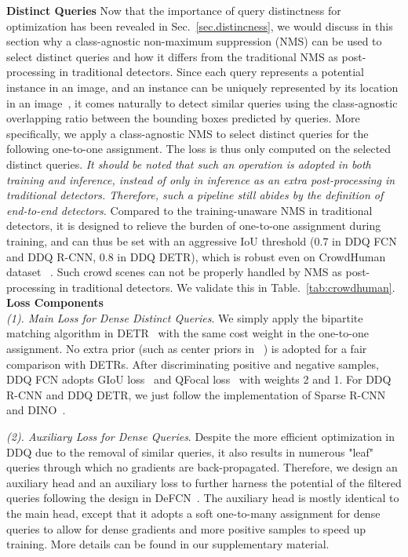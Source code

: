 \documentclass[10pt,twocolumn,letterpaper]{article}
\begin{document}
\noindent\textbf{Distinct Queries} Now that the importance of query distinctness for optimization has been revealed in Sec.~\ref{sec.distincness}, we would discuss in this section why a class-agnostic non-maximum suppression (NMS) can be used to select distinct queries and how it differs from the traditional NMS as post-processing in traditional detectors. Since each query represents a potential instance in an image, and an instance can be uniquely represented by its location in an image~\cite{wang2020solo}, it comes naturally to detect similar queries using the class-agnostic overlapping ratio between the bounding boxes predicted by queries. More specifically, we apply a class-agnostic NMS to select distinct queries for the following one-to-one assignment. The loss is thus only computed on the selected distinct queries. \emph{It should be noted that such an operation is adopted in both training and inference, instead of only in inference as an extra post-processing in traditional detectors. Therefore, such a pipeline still abides by the definition of end-to-end detectors.} Compared to the training-unaware NMS in traditional detectors, it is designed to relieve the burden of one-to-one assignment during training, and can thus be set with an aggressive IoU threshold (0.7 in DDQ FCN and DDQ R-CNN, 0.8 in DDQ DETR), which is robust even on CrowdHuman dataset ~\cite{shao2018crowdhuman}. Such crowd scenes can not be properly handled by NMS as post-processing in traditional detectors. We validate this in Table.~\ref{tab:crowdhuman}.\\

\noindent\textbf{Loss Components} \label{sec:mainloss} \\
\emph{(1). Main Loss for Dense Distinct Queries}. We simply apply the bipartite matching algorithm in DETR~\cite{carion2020end} with the same cost weight in the one-to-one assignment. No extra prior (such as center priors in ~\cite{wang2021end}) is adopted for a fair comparison with DETRs. After discriminating positive and negative samples, DDQ FCN adopts GIoU loss~\cite{rezatofighi2019generalized} and QFocal loss~\cite{li2021generalized} with weights 2 and 1. For DDQ R-CNN and DDQ DETR, we just follow the implementation of Sparse R-CNN~\cite{sun2021sparse} and DINO~\cite{zhang2022dino}.

\noindent\emph{(2). Auxiliary Loss for Dense Queries}. Despite the more efficient optimization in DDQ due to the removal of similar queries, it also results in numerous "leaf" queries through which no gradients are back-propagated. Therefore, we design an auxiliary head and an auxiliary loss to further harness the potential of the filtered queries following the design in DeFCN~\cite{wang2021end}. The auxiliary head is mostly identical to the main head, except that it adopts a soft one-to-many assignment for dense queries to allow for dense gradients and more positive samples to speed up training. More details can be found in our supplementary material.
\vspace{-1mm}
\end{document}
